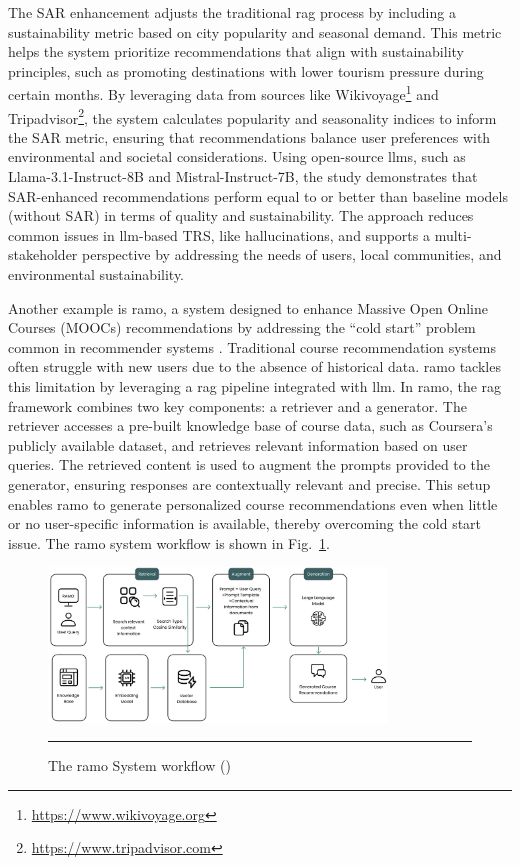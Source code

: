 The SAR enhancement adjusts the traditional \gls{rag} process by including a sustainability metric based on city popularity and seasonal demand.
This metric helps the system prioritize recommendations that align with sustainability principles, such as promoting destinations with lower tourism pressure during certain months.
By leveraging data from sources like Wikivoyage\footnote{\url{https://www.wikivoyage.org}} and Tripadvisor\footnote{\url{https://www.tripadvisor.com}}, the system calculates popularity and seasonality indices to inform the SAR metric, ensuring that recommendations balance user preferences with environmental and societal considerations.
Using open-source \glspl{llm}, such as Llama-3.1-Instruct-8B and Mistral-Instruct-7B, the study demonstrates that SAR-enhanced recommendations perform equal to or better than baseline models (without SAR) in terms of quality and sustainability.
The approach reduces common issues in \gls{llm}-based TRS, like hallucinations, and supports a multi-stakeholder perspective by addressing the needs of users, local communities, and environmental sustainability.

Another example is \gls{ramo}, a system designed to enhance Massive Open Online Courses (MOOCs) recommendations by addressing the ``cold start'' problem common in recommender systems \cite{Rao2024}.
Traditional course recommendation systems often struggle with new users due to the absence of historical data.
\gls{ramo} tackles this limitation by leveraging a \gls{rag} pipeline integrated with \gls{llm}.
In \gls{ramo}, the \gls{rag} framework combines two key components: a retriever and a generator.
The retriever accesses a pre-built knowledge base of course data, such as Coursera's publicly available dataset, and retrieves relevant information based on user queries.
The retrieved content is used to augment the prompts provided to the generator, ensuring responses are contextually relevant and precise.
This setup enables \gls{ramo} to generate personalized course recommendations even when little or no user-specific information is available, thereby overcoming the cold start issue.
The \gls{ramo} system workflow is shown in Fig.~\ref{fig:ramo-system-workflow}.

\begin{figure}[htbp]
    \centering
    \includegraphics[width=0.8\textwidth]{figures/literature-review/ramo.png}
    \rule{35em}{0.5pt}
    \caption{The \gls{ramo} System workflow (\textcite{Rao2024})}
 \label{fig:ramo-system-workflow}
\end{figure}

